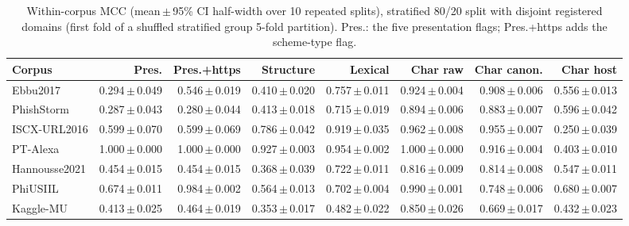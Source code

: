 \begin{table}[tp]
\centering
\caption{Within-corpus MCC (mean\,$\pm$\,95\% CI half-width over 10 repeated splits), stratified 80/20 split with disjoint registered domains (first fold of a shuffled stratified group 5-fold partition). Pres.: the five presentation flags; Pres.+https adds the scheme-type flag.}
\label{tab:within_domain}
\footnotesize
\setlength{\tabcolsep}{3pt}
\begin{adjustbox}{max width=\linewidth}
\begin{tabular}{@{}lrrrrrrr@{}}
\toprule
Corpus & Pres. & Pres.+https & Structure & Lexical & Char raw & Char canon. & Char host \\
\midrule
Ebbu2017 & 0.294\,$\pm$\,0.049 & 0.546\,$\pm$\,0.019 & 0.410\,$\pm$\,0.020 & 0.757\,$\pm$\,0.011 & 0.924\,$\pm$\,0.004 & 0.908\,$\pm$\,0.006 & 0.556\,$\pm$\,0.013 \\
PhishStorm & 0.287\,$\pm$\,0.043 & 0.280\,$\pm$\,0.044 & 0.413\,$\pm$\,0.018 & 0.715\,$\pm$\,0.019 & 0.894\,$\pm$\,0.006 & 0.883\,$\pm$\,0.007 & 0.596\,$\pm$\,0.042 \\
ISCX-URL2016 & 0.599\,$\pm$\,0.070 & 0.599\,$\pm$\,0.069 & 0.786\,$\pm$\,0.042 & 0.919\,$\pm$\,0.035 & 0.962\,$\pm$\,0.008 & 0.955\,$\pm$\,0.007 & 0.250\,$\pm$\,0.039 \\
PT-Alexa & 1.000\,$\pm$\,0.000 & 1.000\,$\pm$\,0.000 & 0.927\,$\pm$\,0.003 & 0.954\,$\pm$\,0.002 & 1.000\,$\pm$\,0.000 & 0.916\,$\pm$\,0.004 & 0.403\,$\pm$\,0.010 \\
Hannousse2021 & 0.454\,$\pm$\,0.015 & 0.454\,$\pm$\,0.015 & 0.368\,$\pm$\,0.039 & 0.722\,$\pm$\,0.011 & 0.816\,$\pm$\,0.009 & 0.814\,$\pm$\,0.008 & 0.547\,$\pm$\,0.011 \\
PhiUSIIL & 0.674\,$\pm$\,0.011 & 0.984\,$\pm$\,0.002 & 0.564\,$\pm$\,0.013 & 0.702\,$\pm$\,0.004 & 0.990\,$\pm$\,0.001 & 0.748\,$\pm$\,0.006 & 0.680\,$\pm$\,0.007 \\
Kaggle-MU & 0.413\,$\pm$\,0.025 & 0.464\,$\pm$\,0.019 & 0.353\,$\pm$\,0.017 & 0.482\,$\pm$\,0.022 & 0.850\,$\pm$\,0.026 & 0.669\,$\pm$\,0.017 & 0.432\,$\pm$\,0.023 \\
\bottomrule
\end{tabular}
\end{adjustbox}
\end{table}
